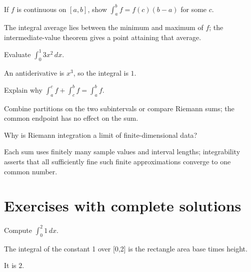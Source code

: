 \begin{problem}\label{prob:ii10-problem-09}
If $f$ is continuous on $[a,b]$, show $\int_a^bf=f(c)(b-a)$ for some $c$.
\end{problem}
\begin{solution}
The integral average lies between the minimum and maximum of $f$; the intermediate-value theorem gives a point attaining that average.
\end{solution}

\begin{problem}\label{prob:ii10-problem-10}
Evaluate $\int_0^1 3x^2\,dx$.
\end{problem}
\begin{solution}
An antiderivative is $x^3$, so the integral is $1$.
\end{solution}

\begin{problem}[Additivity]\label{prob:ii10-problem-11}
Explain why $\int_a^cf+\int_c^bf=\int_a^bf$.
\end{problem}
\begin{solution}
Combine partitions on the two subintervals or compare Riemann sums; the common endpoint has no effect on the sum.
\end{solution}

\begin{problem}\label{prob:ii10-problem-12}
Why is Riemann integration a limit of finite-dimensional data?
\end{problem}
\begin{solution}
Each sum uses finitely many sample values and interval lengths; integrability asserts that all sufficiently fine such finite approximations converge to one common number.
\end{solution}

\section{Exercises with complete solutions}

\begin{exercise}\label{exr:ii10-01}
Compute $\int_0^2 1\,dx$.
\end{exercise}
\begin{hint}
The integral of the constant 1 over [0,2] is the rectangle area base times height.
\end{hint}
\begin{solution}
It is $2$.
\end{solution}

